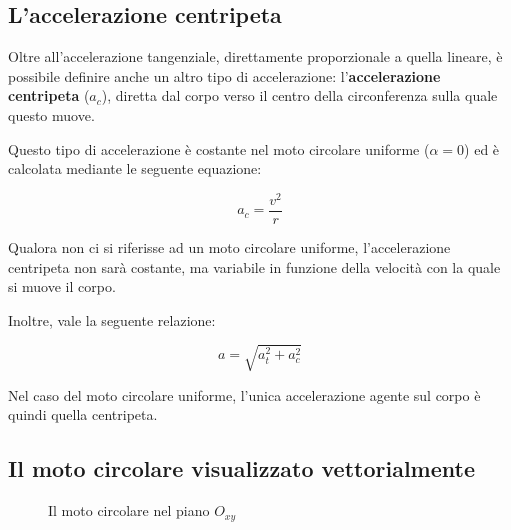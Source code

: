\subsection{L'accelerazione centripeta}

Oltre all'accelerazione tangenziale, direttamente proporzionale a
quella lineare, è possibile definire anche un altro tipo di
accelerazione: l'\textbf{accelerazione centripeta} ($a_c$), diretta dal
corpo verso il centro della circonferenza sulla quale questo muove.

Questo tipo di accelerazione è costante nel moto circolare uniforme
($\alpha=0$) ed è calcolata mediante le seguente equazione:

\begin{equation}
    a_c=\frac{v^2}{r}
    \label{eq:acc_c}
\end{equation}

Qualora non ci si riferisse ad un moto circolare uniforme,
l'accelerazione centripeta non sarà costante, ma variabile in
funzione della velocità con la quale si muove il corpo.

Inoltre, vale la seguente relazione:

\begin{equation}
    a=\sqrt{a_t^2 + a_c^2}
    \label{eq:acc_moto_cir}
\end{equation}

Nel caso del moto circolare uniforme, l'unica
accelerazione agente sul corpo è quindi quella centripeta.

\subsection{Il moto circolare visualizzato vettorialmente}

\vskip 0.1in

\begin{wrapfigure}[12]{l}{0.5\textwidth}

    \caption{Il moto circolare nel piano $O_{xy}$} \label{fig:moto_circolare}
\end{wrapfigure}

